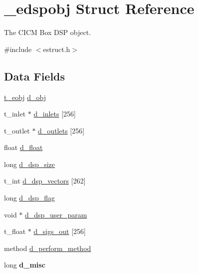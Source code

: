 \hypertarget{struct__edspobj}{\section{\-\_\-edspobj Struct Reference}
\label{struct__edspobj}
}


The C\-I\-C\-M Box D\-S\-P object.  




{\ttfamily \#include $<$estruct.\-h$>$}

\subsection*{Data Fields}
\begin{DoxyCompactItemize}
\item 
\hyperlink{struct__eobj}{t\-\_\-eobj} \hyperlink{struct__edspobj_a987087c8b9df0fa2ae99bd44ab53dab9}{d\-\_\-obj}
\item 
t\-\_\-inlet $\ast$ \hyperlink{struct__edspobj_af58ea0594fc028861443f36dc2d1ebf4}{d\-\_\-inlets} \mbox{[}256\mbox{]}
\item 
t\-\_\-outlet $\ast$ \hyperlink{struct__edspobj_a529a1e3597eb3ee79f6cabef51f41ef9}{d\-\_\-outlets} \mbox{[}256\mbox{]}
\item 
float \hyperlink{struct__edspobj_aaa8c8ad1277112523fd01b5058e0fcb5}{d\-\_\-float}
\item 
long \hyperlink{struct__edspobj_a0bb016ebe02ce3d3a0965a19c1d8476d}{d\-\_\-dsp\-\_\-size}
\item 
t\-\_\-int \hyperlink{struct__edspobj_a6c9361ef0820022b61cd7894d641c029}{d\-\_\-dsp\-\_\-vectors} \mbox{[}262\mbox{]}
\item 
long \hyperlink{struct__edspobj_af3409f354253e5753dbba6b22472972e}{d\-\_\-dsp\-\_\-flag}
\item 
void $\ast$ \hyperlink{struct__edspobj_ab056760f93f95b4edc3a8dddd0b5b62f}{d\-\_\-dsp\-\_\-user\-\_\-param}
\item 
t\-\_\-float $\ast$ \hyperlink{struct__edspobj_aebb3e36050cca90ec2bbfc8226198ca8}{d\-\_\-sigs\-\_\-out} \mbox{[}256\mbox{]}
\item 
method \hyperlink{struct__edspobj_ae13acca7c0f073f1030545ce368e6e03}{d\-\_\-perform\-\_\-method}
\item 
\hypertarget{struct__edspobj_a4c692fd24facbf12d763b7f8d813c266}{long {\bfseries d\-\_\-misc}}\label{struct__edspobj_a4c692fd24facbf12d763b7f8d813c266}

\end{DoxyCompactItemize}


